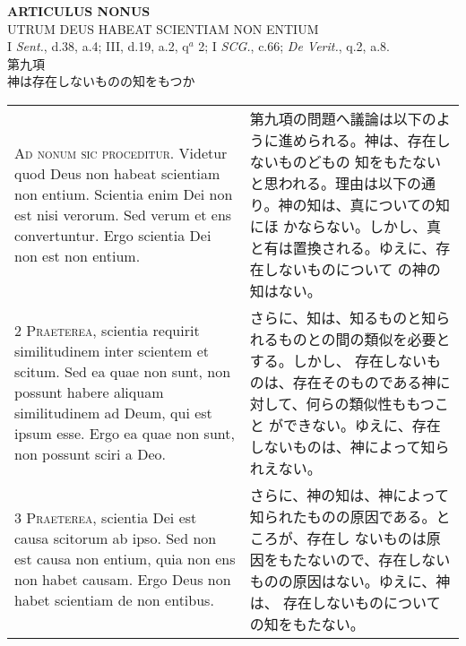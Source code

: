 \documentclass[10pt]{jsarticle} %
\begin{document}
\newpage



\begin{center}
{\Large {\bf ARTICULUS NONUS}}\\ {\large UTRUM DEUS HABEAT SCIENTIAM
NON ENTIUM}\\ {\footnotesize I {\itshape Sent.}, d.38, a.4; III,
d.19, a.2, q$^a$ 2; I {\itshape SCG.}, c.66; {\itshape De Verit.},
q.2, a.8.}\\ {\Large 第九項\\神は存在しないものの知をもつか}
\end{center}

\begin{longtable}{p{21em}p{21em}}


{\huge A}{\scshape d nonum sic proceditur}. Videtur quod Deus non
habeat scientiam non entium. Scientia enim Dei non est nisi
verorum. Sed verum et ens convertuntur. Ergo scientia Dei non est non
entium.

&

第九項の問題へ議論は以下のように進められる。神は、存在しないものどもの
知をもたないと思われる。理由は以下の通り。神の知は、真についての知にほ
かならない。しかし、真と有は置換される。ゆえに、存在しないものについて
の神の知はない。

\\



{\scshape 2 Praeterea}, scientia requirit similitudinem inter scientem
et scitum. Sed ea quae non sunt, non possunt habere aliquam
similitudinem ad Deum, qui est ipsum esse. Ergo ea quae non sunt, non
possunt sciri a Deo.

&

さらに、知は、知るものと知られるものとの間の類似を必要とする。しかし、
存在しないものは、存在そのものである神に対して、何らの類似性ももつこと
ができない。ゆえに、存在しないものは、神によって知られえない。

\\



{\scshape 3 Praeterea}, scientia Dei est causa scitorum ab ipso. Sed
non est causa non entium, quia non ens non habet causam. Ergo Deus non
habet scientiam de non entibus.

&

さらに、神の知は、神によって知られたものの原因である。ところが、存在し
ないものは原因をもたないので、存在しないものの原因はない。ゆえに、神は、
存在しないものについての知をもたない。


\end{longtable}
\end{document}
